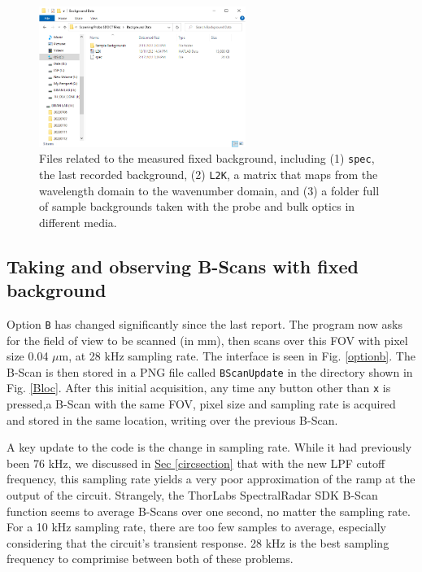 \documentclass{article}
\begin{document}
\begin{figure}[!h]\label{specloc}
	\centering
	\includegraphics[width=0.6\textwidth]{Data for Probe Writeup/spec location.png}
	\caption{Files related to the measured fixed background, including (1) \texttt{spec}, the last recorded background, (2) \texttt{L2K}, a matrix that maps from the wavelength domain to the wavenumber domain, and (3) a folder full of sample backgrounds taken with the probe and bulk optics in different media.}
\end{figure}

\subsection{Taking and observing B-Scans with fixed background}

\par{Option \texttt{B} has changed significantly since the last report. The program now asks for the field of view to be scanned (in mm), then scans over this FOV with pixel size 0.04 $\mu$m, at 28 kHz sampling rate. The interface is seen in Fig. \ref{optionb}. The B-Scan is then stored in a PNG file called \texttt{BScanUpdate} in the directory shown in Fig. \ref{Bloc}. After this initial acquisition, any time any button other than \texttt{x} is pressed,a B-Scan with the same FOV, pixel size and sampling rate is acquired and stored in the same location, writing over the previous B-Scan.}

\par{A key update to the code is the change in sampling rate. While it had previously been 76 kHz, we discussed in \hyperlink{circsection}{Sec \ref{circsection}} that with the new LPF cutoff frequency, this sampling rate yields a very poor approximation of the ramp at the output of the circuit. Strangely, the ThorLabs SpectralRadar SDK B-Scan function seems to average B-Scans over one second, no matter the sampling rate. For a 10 kHz sampling rate, there are too few samples to average, especially considering that the circuit's transient response. 28 kHz is the best sampling frequency to comprimise between both of these problems.}
\end{document}
